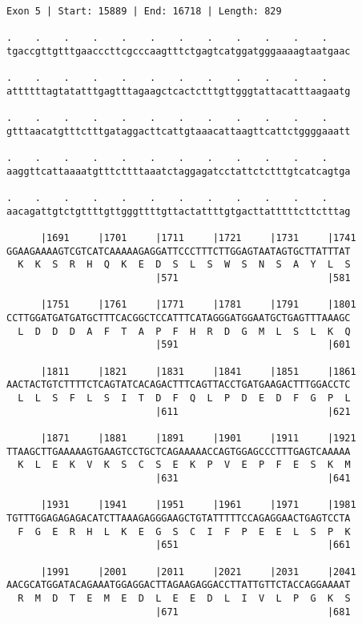 \documentclass{article}
\begin{document}
\begin{Verbatim}
Exon 5 | Start: 15889 | End: 16718 | Length: 829
 
.    .    .    .    .    .    .    .    .    .    .    .    
tgaccgttgtttgaacccttcgcccaagtttctgagtcatggatgggaaaagtaatgaac
  
.    .    .    .    .    .    .    .    .    .    .    .    
attttttagtatatttgagtttagaagctcactctttgttgggtattacatttaagaatg
  
.    .    .    .    .    .    .    .    .    .    .    .    
gtttaacatgtttctttgataggacttcattgtaaacattaagttcattctggggaaatt
  
.    .    .    .    .    .    .    .    .    .    .    .    
aaggttcattaaaatgtttcttttaaatctaggagatcctattctctttgtcatcagtga
  
.    .    .    .    .    .    .    .    .    .    .    .    
aacagattgtctgttttgttgggttttgttactattttgtgacttatttttcttctttag
  
      |1691     |1701     |1711     |1721     |1731     |1741
GGAAGAAAAGTCGTCATCAAAAAGAGGATTCCCTTTCTTGGAGTAATAGTGCTTATTTAT
  K  K  S  R  H  Q  K  E  D  S  L  S  W  S  N  S  A  Y  L  S
                          |571                          |581
  
      |1751     |1761     |1771     |1781     |1791     |1801
CCTTGGATGATGATGCTTTCACGGCTCCATTTCATAGGGATGGAATGCTGAGTTTAAAGC
  L  D  D  D  A  F  T  A  P  F  H  R  D  G  M  L  S  L  K  Q
                          |591                          |601
  
      |1811     |1821     |1831     |1841     |1851     |1861
AACTACTGTCTTTTCTCAGTATCACAGACTTTCAGTTACCTGATGAAGACTTTGGACCTC
  L  L  S  F  L  S  I  T  D  F  Q  L  P  D  E  D  F  G  P  L
                          |611                          |621
  
      |1871     |1881     |1891     |1901     |1911     |1921
TTAAGCTTGAAAAAGTGAAGTCCTGCTCAGAAAAACCAGTGGAGCCCTTTGAGTCAAAAA
  K  L  E  K  V  K  S  C  S  E  K  P  V  E  P  F  E  S  K  M
                          |631                          |641
  
      |1931     |1941     |1951     |1961     |1971     |1981
TGTTTGGAGAGAGACATCTTAAAGAGGGAAGCTGTATTTTTCCAGAGGAACTGAGTCCTA
  F  G  E  R  H  L  K  E  G  S  C  I  F  P  E  E  L  S  P  K
                          |651                          |661
  
      |1991     |2001     |2011     |2021     |2031     |2041
AACGCATGGATACAGAAATGGAGGACTTAGAAGAGGACCTTATTGTTCTACCAGGAAAAT
  R  M  D  T  E  M  E  D  L  E  E  D  L  I  V  L  P  G  K  S
                          |671                          |681
  

\end{Verbatim}
\end{document}
